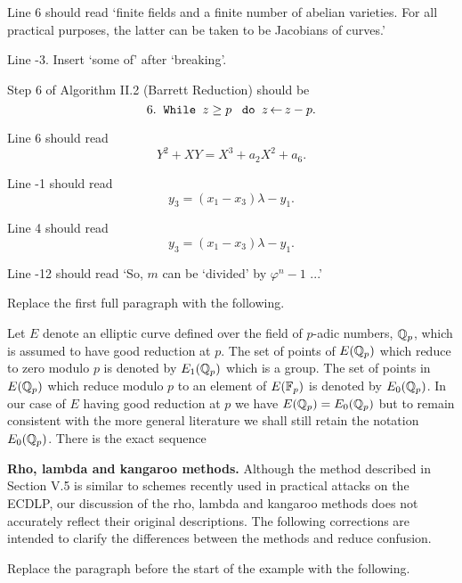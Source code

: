 \begin{description}
\addtolength{\itemsep}{2mm}

\item[p.\ 7] Line 6 should read `finite fields and 
a finite number of abelian varieties.
For all practical purposes, the latter can be taken to be Jacobians of
curves.'

\item[p.\ 7] Line -3. Insert `some of' after `breaking'.

\item[p.\ 14] Step 6 of Algorithm II.2 (Barrett Reduction) should be
\[
 6. \;\;\mbox{\tt While  } z \geq p \;\;\;\mbox{\tt do  } z \mbox{$\,\leftarrow$\,} z-p.  \]

\item[p.\ 42] Line 6 should read
\[ Y^2 + X Y = X^3 + a_2 X^2 + a_6. \]

\item[p.\ 57] Line -1 should read
\[ y_3 = (x_1-x_3) \lambda - y_1. \]

\item[p.\ 58] Line 4 should read
\[ y_3 = (x_1-x_3) \lambda - y_1. \]

\item[p.\ 76] Line -12 should read `So, $m$ can be `divided' by $\varphi^n-1$ ...'

\item[p.\ 89] Replace the first full paragraph with the following.

Let $E$ denote an elliptic curve defined over the field of $p$-adic
numbers, ${\Bbb Q}_p$, which is assumed to have good reduction at $p$.
The set of points of $E({\Bbb Q}_p)$ which reduce to zero modulo $p$ is
denoted by $E_1({\Bbb Q}_p)$ which is a group.
The set of points in $E({\Bbb Q}_p)$ which reduce modulo $p$ to
an element of $E({\Bbb F}_p)$ is denoted by $E_0({\Bbb Q}_p)$.
In our case of $E$ having good reduction at $p$ we have 
$E({\Bbb Q}_p) = E_0({\Bbb Q}_p)$ but to remain consistent with the more general 
literature we shall still retain the notation $E_0({\Bbb Q}_p)$.
There is the exact sequence

\item[pp.\ 92--97] {\bf Rho, lambda and kangaroo methods.}
Although the method described in Section V.5 is similar
to schemes recently used in practical attacks on the
ECDLP, our discussion of the rho, lambda and kangaroo methods
does not accurately reflect their original descriptions.
The following corrections are intended to clarify the differences
between the methods and reduce confusion.

\item[p.\ 92]
Replace the paragraph before the start of the example with the following.


\end{description}

